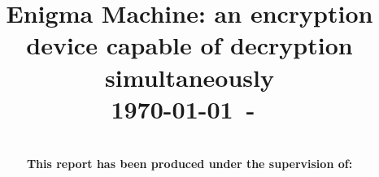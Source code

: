 \documentclass[conference,compsoc]{IEEEtran}
\begin{document}
% 
\title{Enigma Machine: an encryption device capable of decryption simultaneously\\
{\small \today~-~\currenttime}}

 
\author{
\\
{\bf This report has been produced under the supervision of:}\\
%
}


% 
\end{document}
